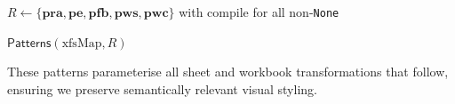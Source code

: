 \begin{algorithm}
{  %

  $R \leftarrow \{\textbf{pra},\textbf{pe},\textbf{pfb},\textbf{pws},\textbf{pwc}\}$ with \textsf{compile} for all non-\texttt{None}\;


  \Return $\textsf{Patterns}(\mathrm{xfsMap}, R)$\;
}
\caption{Consolidated construction: compute alternations and build dependent regexes in the same branch.}
\label{alg:build-wb-patterns}
\end{algorithm}



These patterns parameterise all sheet and workbook transformations that follow, ensuring we preserve semantically relevant visual styling.



